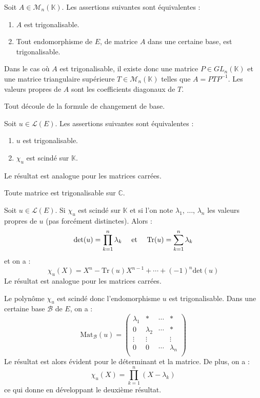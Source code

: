 \documentclass[a4paper,10pt]{report}
\begin{document}
 \begin{thm} Soit $A \in \mathcal{M}_n(\mathbb{K})$. Les assertions suivantes sont équivalentes :
 
 \begin{enumerate}
 \item $A$ est trigonalisable.
 \item Tout endomorphisme de $E$, de matrice $A$ dans une certaine base, est trigonalisable.
 \end{enumerate}
 Dans le cas où $A$ est trigonalisable, il existe donc une matrice $P \in GL_n(\mathbb{K})$ et une matrice triangulaire supérieure $T \in \mathcal{M}_n(\mathbb{K})$ telles que $A=PTP^{-1}$. Les valeurs propres de $A$ sont les coefficients diagonaux de $T$.
\end{thm}

\begin{preuve} Tout découle de la formule de changement de base. 
\end{preuve}

\begin{thm} Soit $u \in \mathcal{L}(E)$. Les assertions suivantes sont équivalentes :

\begin{enumerate}
\item $u$ est trigonalisable.
\item $\chi_u$ est scindé sur $\mathbb{K}$.
\end{enumerate}
Le résultat est analogue pour les matrices carrées.
\end{thm}

\begin{cor} Toute matrice est trigonalisable sur $\mathbb{C}$.
\end{cor}

\begin{prop} Soit $u \in \mathcal{L}(E)$. Si $\chi_u$ est scindé sur $\mathbb{K}$ et si l'on note $\lambda_1$, $\ldots$, $\lambda_n$ les valeurs propres de $u$ (pas forcément distinctes). Alors :
$$ \textrm{det}(u) = \prod_{k=1}^n \lambda_k \quad \hbox{ et }  \quad \textrm{Tr}(u) = \sum_{k=1}^n \lambda_k $$
et on a :
$$ \chi_u(X) = X^n - \textrm{Tr}(u) X^{n-1} + \cdots + (-1)^n \textrm{det}(u)$$
Le résultat est analogue pour les matrices carrées.
\end{prop}

\begin{preuve} Le polynôme $\chi_u$ est scindé donc l'endomorphisme $u$ est trigonalisable. Dans une certaine base $\mathcal{B}$ de $E$, on a :
$$ \textrm{Mat}_{\mathcal{B}}(u) = \begin{pmatrix}
\lambda_1 & * & \cdots & * \\
0 & \lambda_2 & \cdots & * \\
\vdots & \vdots & & \vdots \\
0 & 0 & \cdots & \lambda_n \\
\end{pmatrix}$$
Le résultat est alors évident pour le déterminant et la matrice. De plus, on a :
$$ \chi_u(X) = \prod_{k=1}^n (X- \lambda_k)$$
ce qui donne en développant le deuxième résultat.
\end{preuve}
\end{document}
